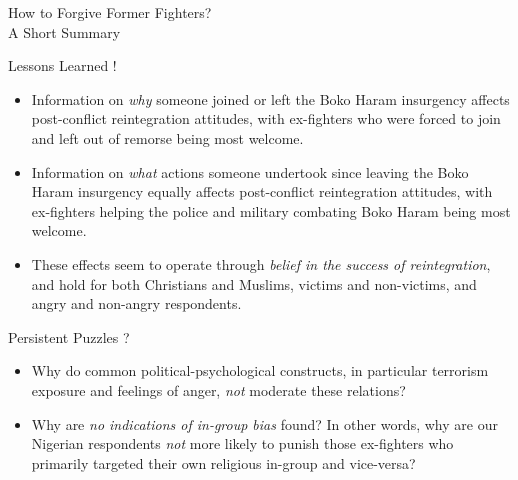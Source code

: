 
\vspace*{1mm}
\begin{flushright}
\Large{How to Forgive Former Fighters? \\
A Short Summary}
\end{flushright} 

\vspace{1cm}
\normalsize

\begin{Box1}{Lessons Learned !}
\begin{itemize}[noitemsep]
\item  Information on \textit{why} someone joined or left the Boko Haram insurgency affects post-conflict reintegration attitudes, with ex-fighters who were forced to join and left out of remorse being most welcome.
\item  Information on \textit{what} actions someone undertook since leaving the Boko Haram insurgency equally affects post-conflict reintegration attitudes, with ex-fighters helping the police and military combating Boko Haram being most welcome.
\item These effects seem to operate through \textit{belief in the success of reintegration}, and hold for both Christians and Muslims, victims and non-victims, and angry and non-angry respondents. 
\end{itemize}
\end{Box1}

\vspace{1cm}

\begin{Box1}{Persistent Puzzles ?}
\begin{itemize}[noitemsep]
\item  Why do common political-psychological constructs, in particular terrorism exposure and feelings of anger, \textit{not} moderate these relations?
\item Why are \textit{no indications of in-group bias} found? In other words, why are our Nigerian respondents \textit{not} more likely to punish those ex-fighters who primarily targeted their own religious in-group and vice-versa?
\end{itemize}
\end{Box1}
